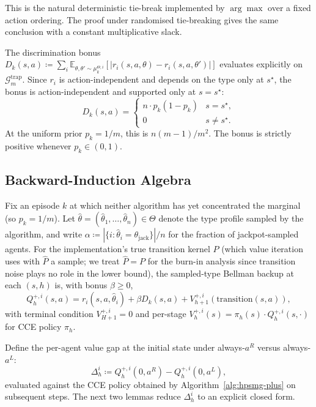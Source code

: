 \documentclass{article}
\begin{document}
This is the natural deterministic tie-break implemented by $\arg\max$ over a fixed action ordering. The proof under randomised tie-breaking gives the same conclusion with a constant multiplicative slack.

The discrimination bonus $D_k(s, a) \coloneqq \sum_i \mathbb{E}_{\theta, \theta' \sim \mu_k^{\Theta, i}}[|r_i(s, a, \theta) - r_i(s, a, \theta')|]$ evaluates explicitly on $\mathcal{G}_m^{\mathrm{trap}}$. Since $r_i$ is action-independent and depends on the type only at $s^\star$, the bonus is action-independent and supported only at $s = s^\star$:
\begin{equation}
\label{eq:Dk-trap}
D_k(s, a) = \begin{cases} n \cdot p_k(1 - p_k) & s = s^\star, \\ 0 & s \neq s^\star. \end{cases}
\end{equation}
At the uniform prior $p_k = 1/m$, this is $n(m-1)/m^2$. The bonus is strictly positive whenever $p_k \in (0, 1)$.

\subsection{Backward-Induction Algebra}
\label{app:hpsmg-plus-backward}

Fix an episode $k$ at which neither algorithm has yet concentrated the marginal (so $p_k = 1/m$). Let $\hat\theta = (\hat\theta_1, \ldots, \hat\theta_n) \in \Theta$ denote the type profile sampled by the algorithm, and write $\alpha \coloneqq |\{i : \hat\theta_i = \theta_{\mathrm{jack}}\}|/n$ for the fraction of jackpot-sampled agents. For the implementation's true transition kernel $P$ (which value iteration uses with $\hat P$ a sample; we treat $\hat P = P$ for the burn-in analysis since transition noise plays no role in the lower bound), the sampled-type Bellman backup at each $(s, h)$ is, with bonus $\beta \geq 0$,
\begin{equation}
\label{eq:bellman-plus}
Q^{+, i}_h(s, a) = r_i(s, a, \hat\theta_i) + \beta D_k(s, a) + V^{+, i}_{h+1}(\mathrm{transition}(s, a)),
\end{equation}
with terminal condition $V^{+, i}_{H+1} = 0$ and per-stage $V^{+, i}_h(s) = \pi_h(s) \cdot Q^{+, i}_h(s, \cdot)$ for CCE policy $\pi_h$.

Define the per-agent value gap at the initial state under always-$a^R$ versus always-$a^L$:
\begin{equation}
\Delta^i_h \coloneqq Q^{+, i}_h(0, a^R) - Q^{+, i}_h(0, a^L),
\end{equation}
evaluated against the CCE policy obtained by Algorithm~\ref{alg:hpsmg-plus} on subsequent steps. The next two lemmas reduce $\Delta^i_h$ to an explicit closed form.
\end{document}
